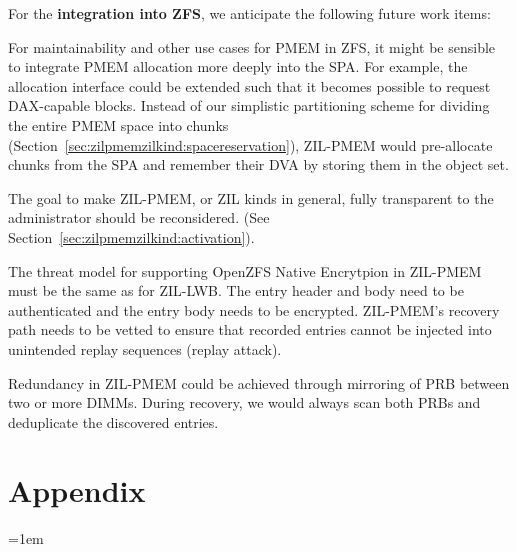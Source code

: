 \documentclass[12pt,a4paper,twoside]{book}
\begin{document}
For the \textbf{integration into ZFS}, we anticipate the following future work items:
\begin{description}[noitemsep,leftmargin=1.5cm,labelindent=1cm]
    \item[PMEM Space Management] For maintainability and other use cases for PMEM in ZFS, it might be sensible to integrate PMEM allocation more deeply into the SPA.
        For example, the allocation interface could be extended such that it becomes possible to request DAX-capable blocks.
        Instead of our simplistic partitioning scheme for dividing the entire PMEM space into chunks (Section~\ref{sec:zilpmemzilkind:spacereservation}), ZIL-PMEM would pre-allocate chunks from the SPA and remember their DVA by storing them in the object set.

    \item[ZIL Kinds UX] The goal to make ZIL-PMEM, or ZIL kinds in general, fully transparent to the administrator should be reconsidered.
        (See Section~\ref{sec:zilpmemzilkind:activation}).

    \item[Support for Native Encryption] The threat model for supporting OpenZFS Native Encrytpion in ZIL-PMEM must be the same as for ZIL-LWB.
        The entry header and body need to be authenticated and the entry body needs to be encrypted.
        ZIL-PMEM's recovery path needs to be vetted to ensure that recorded entries cannot be injected into unintended replay sequences (replay attack).

    \item[Redundancy Through Mirroring] Redundancy in ZIL-PMEM could be achieved through mirroring of PRB between two or more DIMMs.
        During recovery, we would always scan both PRBs and deduplicate the discovered entries.
\end{description}

\backmatter

\chapter{Appendix}\label{ch:appendix}

\cleardoublepage
{}
{}
\emergencystretch=1em
\printbibliography
\end{document}
